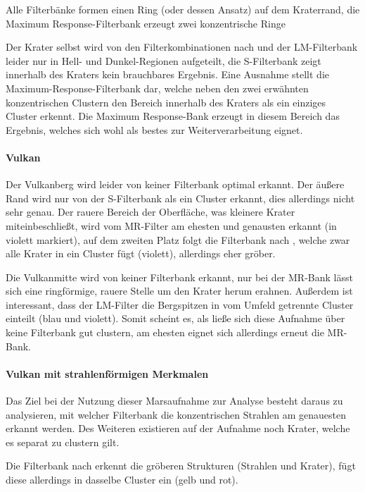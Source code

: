 Alle Filterbänke formen einen Ring (oder dessen Ansatz) auf dem Kraterrand, die Maximum Response-Filterbank erzeugt zwei konzentrische Ringe

Der Krater selbst wird von den Filterkombinationen nach \cite{jain_91} und der LM-Filterbank leider nur in Hell- und Dunkel-Regionen aufgeteilt, die S-Filterbank zeigt innerhalb des Kraters kein brauchbares Ergebnis. Eine Ausnahme stellt die Maximum-Response-Filterbank dar, welche neben den zwei erwähnten konzentrischen Clustern den Bereich innerhalb des Kraters als ein einziges Cluster erkennt. Die Maximum Response-Bank erzeugt in diesem Bereich das Ergebnis, welches sich wohl als bestes zur Weiterverarbeitung eignet.

\paragraph{Vulkan}
Der Vulkanberg wird leider von keiner Filterbank optimal erkannt. Der äußere Rand wird nur von der S-Filterbank als ein Cluster erkannt, dies allerdings nicht sehr genau. Der rauere Bereich der Oberfläche, was kleinere Krater miteinbeschließt, wird vom MR-Filter am ehesten und genausten erkannt (in violett markiert), auf dem zweiten Platz folgt die Filterbank nach \cite{jain_91}, welche zwar alle Krater in ein Cluster fügt (violett), allerdings eher gröber.

Die Vulkanmitte wird von keiner Filterbank erkannt, nur bei der MR-Bank lässt sich eine ringförmige, rauere Stelle um den Krater herum erahnen. Außerdem ist interessant, dass der LM-Filter die Bergspitzen in vom Umfeld getrennte Cluster einteilt (blau und violett). Somit scheint es, als ließe sich diese Aufnahme über keine Filterbank gut clustern, am ehesten eignet sich allerdings erneut die MR-Bank.

\paragraph{Vulkan mit strahlenförmigen Merkmalen}

Das Ziel bei der Nutzung dieser Marsaufnahme zur Analyse besteht daraus zu analysieren, mit welcher Filterbank die konzentrischen Strahlen am genauesten erkannt werden. Des Weiteren existieren auf der Aufnahme noch Krater, welche es separat zu clustern gilt.

Die Filterbank nach \cite{jain_91} erkennt die gröberen Strukturen (Strahlen und Krater), fügt diese allerdings in dasselbe Cluster ein (gelb und rot).

